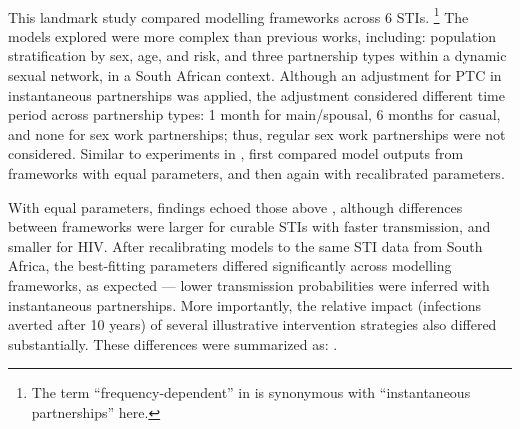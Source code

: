 \paragraph{\citet{Johnson2016mf}}
This landmark study compared modelling frameworks across 6 STIs.%
\footnote{The term ``frequency-dependent'' in \cite{Johnson2016mf} is synonymous with
  ``instantaneous partnerships'' here.}
The models explored were more complex than previous works, including:
population stratification by sex, age, and risk,
and three partnership types within a dynamic sexual network, in a South African context.
Although an adjustment for PTC in instantaneous partnerships was applied,
the adjustment considered different time period across partnership types:
1 month for main/spousal, 6 months for casual, and none for sex work partnerships;
thus, regular sex work partnerships were not considered.
Similar to experiments in , \cite{Johnson2016mf} first compared
model outputs from frameworks with equal parameters, and then again with recalibrated parameters.
\par
With equal parameters, findings echoed those above \cite{Eames2002,Lloyd-Smith2004},
although differences between frameworks were larger for
curable STIs with faster transmission, and smaller for HIV.
After recalibrating models to the same STI data from South Africa,  %
the best-fitting parameters differed significantly across modelling frameworks, as expected
--- \eg lower transmission probabilities were inferred with instantaneous partnerships.
More importantly, the relative impact (infections averted after 10 years)
of several illustrative intervention strategies also differed substantially.
These differences were summarized as:
 \cite{Johnson2016mf}.

